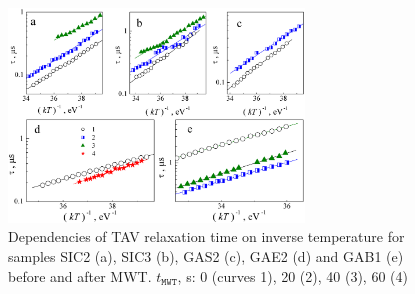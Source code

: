 \documentclass[10pt]{iopart}
\begin{document}
\begin{figure}
\center
\includegraphics[width=0.7\textwidth]{Fig3}
\caption{\label{figTauTAV}
Dependencies of TAV relaxation time on inverse temperature for samples SIC2 (a), SIC3 (b), GAS2 (c), GAE2 (d) and GAB1 (e) before and after MWT.
$t_\mathtt{MWT}$, s: 0 (curves 1), 20 (2), 40 (3), 60 (4)
}%
\end{figure}
\end{document}
